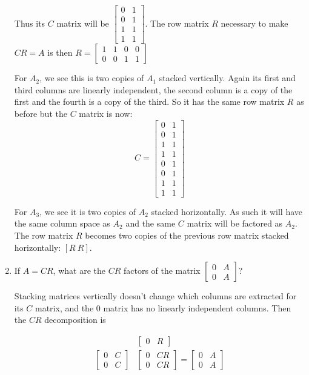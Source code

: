 \documentclass{scrartcl}
\begin{document}
\begin{enumerate}
Thus its $C$ matrix will be $\begin{bmatrix}
	0 & 1 \\ 0 & 1 \\ 1 & 1 \\ 1 & 1
\end{bmatrix}$. The row matrix $R$ necessary to make $CR = A$ is then $R = \begin{bmatrix}
	1 & 1 & 0 & 0 \\ 0 & 0 & 1 & 1 \end{bmatrix}$

For $A_2$, we see this is two copies of $A_1$ stacked vertically. Again its first and third columns are linearly independent, the second column is a copy of the first and the fourth is a copy of the third. So it has the same row matrix $R$ as before but the $C$ matrix is now:
$$C = \begin{bmatrix}
	0 & 1 \\ 0 & 1 \\ 1 & 1 \\ 1 & 1 \\0 & 1 \\ 0 & 1 \\ 1 & 1 \\ 1 & 1 
\end{bmatrix}$$

For $A_3$, we see it is two copies of $A_2$ stacked horizontally. As such it will have the same column space as $A_2$ and the same $C$ matrix will be factored as $A_2$. The row matrix $R$ becomes two copies of the previous row matrix stacked horizontally: $[R \ R]$.

\item If $A=CR$, what are the $CR$ factors of the matrix $\begin{bmatrix}
	0 & A \\ 0 & A
\end{bmatrix}$?

Stacking matrices vertically doesn't change which columns are extracted for its $C$ matrix, and the 0 matrix has no linearly independent columns. Then the $CR$ decomposition is

\begin{align*}
	&\begin{bmatrix}
		0 & R
	\end{bmatrix}\\
	\begin{bmatrix}
	0 & C \\ 0 & C
\end{bmatrix} &\begin{bmatrix}
	0 & CR \\ 0 & CR
\end{bmatrix} = \begin{bmatrix}
	0 & A \\ 0 & A
\end{bmatrix}
\end{align*}


\end{enumerate}
\end{document}
